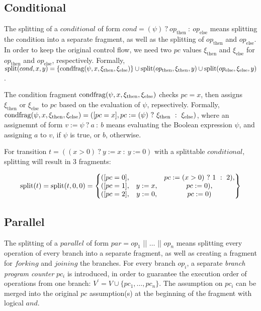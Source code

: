 \subsection{Conditional}
The splitting of a $conditional$ of form $cond = (\psi)\ ?\ op_{\textrm{then}}\ :\ op_{\textrm{else}}$ means splitting the condition into a separate fragment, as well as the splitting of $op_{\textrm{then}}$ and $op_{\textrm{else}}$. In order to keep the original control flow, we need two $pc$ values $\xi_{\textrm{then}}$ and $\xi_{\textrm{else}}$ for $op_{\textrm{then}}$ and $op_{\textrm{else}}$, respectively. Formally, $\mathrm{split}(cond, x, y) = \{ \mathrm{condfrag}(\psi, x, \xi_{\textrm{then}}, \xi_{\textrm{else}}) \} \cup \mathrm{split}(op_{\textrm{then}}, \xi_{\textrm{then}}, y) \cup \mathrm{split}(op_{\textrm{else}}, \xi_{\textrm{else}}, y)$.

The condition fragment $\mathrm{condfrag}(\psi, x, \xi_{\textrm{then}}, \xi_{\textrm{else}})$ checks $pc = x$, then assigns $\xi_{\textrm{then}}$ or $\xi_{\textrm{else}}$ to $pc$ based on the evaluation of $\psi$, repsectively. Formally, $\condfrag(\psi, x, \xi_{\textrm{then}}, \xi_{\textrm{else}}) = ([pc = x], pc := (\psi)\ ?\ \xi_{\textrm{then}}\ :\ \xi_{\textrm{else}})$, where an assignemnt of form $v := \psi\ ?\ a\ :\ b$ means evaluating the Boolean expression $\psi$, and assigning $a$ to $v$, if $\psi$ is true, or $b$, otherwise.

\begin{example}  For transition $t = ((x > 0)\ ?\ y := x\ :\ y := 0)$ with a splittable $conditional$, splitting will result in 3 fragments:

\begin{align*}
\mathrm{split}(t) = \mathrm{split}(t,0,0) = \begin{Bmatrix}
([pc = 0], & & pc := (x > 0)\ ?\ 1\ :\ 2), \\
([pc = 1], & y := x, & pc := 0), \\
([pc = 2], & y := 0, & pc := 0) \\
\end{Bmatrix}
\end{align*}
\end{example}

\subsection{Parallel}
The splitting of a $parallel$ of form $par = op_1$ || $\ldots$ || $op_n$ means splitting every operation of every branch into a separate fragment, as well as creating a fragment for $forking$ and $joining$ the branches. For every branch $op_i$, a separate \textit{branch program counter} $pc_i$ is introduced, in order to guarantee the execution order of operations from one branch: $V^\prime = V \cup \{ pc_1, \ldots, pc_n \}$. The assumption on $pc_i$ can be merged into the original $pc$ assumption(s) at the beginning of the fragment with logical $and$.

